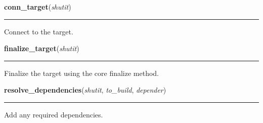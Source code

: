     \label{shutit_main:conn_target}

    \vspace{0.5ex}

\hspace{.8\funcindent}\begin{boxedminipage}{\funcwidth}

    \raggedright \textbf{conn\_target}(\textit{shutit})

    \vspace{-1.5ex}

    \rule{\textwidth}{0.5\fboxrule}
\setlength{\parskip}{2ex}
    Connect to the target.

\setlength{\parskip}{1ex}
    \end{boxedminipage}

    \label{shutit_main:finalize_target}

    \vspace{0.5ex}

\hspace{.8\funcindent}\begin{boxedminipage}{\funcwidth}

    \raggedright \textbf{finalize\_target}(\textit{shutit})

    \vspace{-1.5ex}

    \rule{\textwidth}{0.5\fboxrule}
\setlength{\parskip}{2ex}
    Finalize the target using the core finalize method.

\setlength{\parskip}{1ex}
    \end{boxedminipage}

    \label{shutit_main:resolve_dependencies}

    \vspace{0.5ex}

\hspace{.8\funcindent}\begin{boxedminipage}{\funcwidth}

    \raggedright \textbf{resolve\_dependencies}(\textit{shutit}, \textit{to\_build}, \textit{depender})

    \vspace{-1.5ex}

    \rule{\textwidth}{0.5\fboxrule}
\setlength{\parskip}{2ex}
    Add any required dependencies.

\setlength{\parskip}{1ex}
    \end{boxedminipage}

